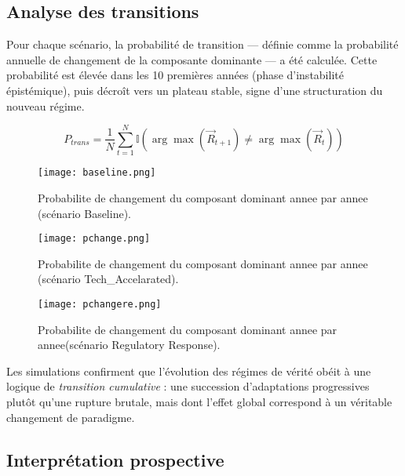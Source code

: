 \documentclass[12pt, a4em]{article}
\begin{document}
	\subsection{ Analyse des transitions}
	
	Pour chaque scénario, la probabilité de transition — définie comme la probabilité annuelle de changement de la composante dominante — a été calculée.  
	Cette probabilité est élevée dans les 10 premières années (phase d’instabilité épistémique), puis décroît vers un plateau stable, signe d’une structuration du nouveau régime.
	
	\[
	P_{trans} = \frac{1}{N}\sum_{t=1}^{N} \mathbb{I}(\arg\max(\vec{R}_{t+1}) \neq \arg\max(\vec{R}_t))
	\]
	\vspace{5.2cm}
	\begin{figure}[h]
		\centering
		\begin{minipage}{0.45\textwidth}
			\centering
			\texttt{[image: baseline.png]}
			\caption{Probabilite de changement du composant dominant annee par annee (scénario Baseline).}
			\label{fig:probabilite baseline}
		\end{minipage}
		\hfill
		\begin{minipage}{0.45\textwidth}
			\centering
			\texttt{[image: pchange.png]}
			\caption{Probabilite de changement du composant dominant annee par annee (scénario Tech\_Accelarated).}
			\label{fig:probabilite techaccelerated}
		\end{minipage}
		\hfill
		\begin{minipage}{0.45\textwidth}
			\centering
			\texttt{[image: pchangere.png]}
			\caption{Probabilite de changement du composant dominant annee par annee(scénario Regulatory Response).}
			\label{fig:probabilite regulatory}
		\end{minipage}
		\vspace{0.3cm}
	\end{figure}
	
	Les simulations confirment que l’évolution des régimes de vérité obéit à une logique de \textit{transition cumulative} : une succession d’adaptations progressives plutôt qu’une rupture brutale, mais dont l’effet global correspond à un véritable changement de paradigme.
	
	\subsection{ Interprétation prospective}
	
\end{document}
